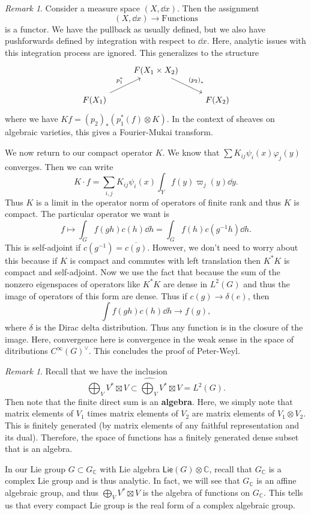 \documentclass[leqno, openany]{memoir}
\theoremstyle{definition}
\theoremstyle{remark}
\newtheorem{rmk}[thm]{Remark}
\theoremstyle{plain}
\theoremstyle{definition}
\theoremstyle{remark}
\newcommand{\C}{\mathbb{C}}
\newcommand{\ms}[1]{\mathsf{#1}}
\newcommand{\ol}[1]{\overline{#1}}
\newcommand{\wh}[1]{\widehat{#1}}
\begin{document}
\begin{rmk}
    Consider a measure space $(X,\dd{x})$. Then the assignment
    \[ (X,\dd{x}) \longrightarrow \text{Functions} \]
    is a functor. We have the pullback as usually defined, but we also have pushforwards defined by integration with respect to $\dd{x}$. Here, analytic issues with this integration process are ignored. This generalizes to the structure
    \begin{equation*}
    \begin{tikzcd}
        & F(X_1 \times X_2) \arrow{dr}{{(p_2)}_*} \\
        F(X_1) \arrow{ur}{p_1^*} & & F(X_2)
    \end{tikzcd}
    \end{equation*}
    where we have $Kf = {(p_2)}_* (p_1^*(f) \otimes K)$. In the context of sheaves on algebraic varieties, this gives a Fourier-Mukai transform.
\end{rmk}

We now return to our compact operator $K$. We know that $\sum K_{ij} \psi_i(x) \varphi_j(y)$ converges. Then we can write
\[ K \cdot f = \sum_{i,j} K_{ij} \psi_i(x) \int_Y f(y) \varpi_j(y) \dd{y}. \]
Thus $K$ is a limit in the operator norm of operators of finite rank and thus $K$ is compact. The particular operator we want is
\[ f \mapsto \int_G f(gh) c(h) \dd{h} = \int_G f(h) c(g^{-1}h) \dd{h}. \]
This is self-adjoint if $c(g^{-1}) = \ol{c(g)}$. However, we don't need to worry about this because if $K$ is compact and commutes with left translation then $K^*K$ is compact and self-adjoint. Now we use the fact that because the sum of the nonzero eigenspaces of operators like $K^* K$ are dense in $L^2(G)$ and thus the image of operators of this form are dense. Thus if $c(g) \to \delta(e)$, then
\[ \int f(gh) c(h) \dd{h} \to f(g), \]
where $\delta$ is the Dirac delta distribution. Thus any function is in the closure of the image. Here, convergence here is convergence in the weak sense in the space of ditributions $C^{\infty}{(G)}^{\vee}$. This concludes the proof of Peter-Weyl.

\begin{rmk}
    Recall that we have the inclusion
    \[ \bigoplus_V V^* \boxtimes V \subset \wh{\bigoplus_V} V^* \boxtimes V = L^2(G). \]
    Then note that the finite direct sum is an \textbf{algebra}. Here, we simply note that matrix elements of $V_1$ times matrix elements of $V_2$ are matrix elements of $V_1 \otimes V_2$. This is finitely generated (by matrix elements of any faithful representation and its dual). Therefore, the space of functions has a finitely generated dense subset that is an algebra.

    In our Lie group $G \subset G_{\C}$ with Lie algebra $\ms{Lie}(G) \otimes \C$, recall that $G_{\C}$ is a complex Lie group and is thus analytic. In fact, we will see that $G_{\C}$ is an affine algebraic group, and thus $\bigoplus_V V^* \boxtimes V$ is the algebra of functions on $G_{\C}$. This tells us that every compact Lie group is the real form of a complex algebraic group.
\end{rmk}
\end{document}
